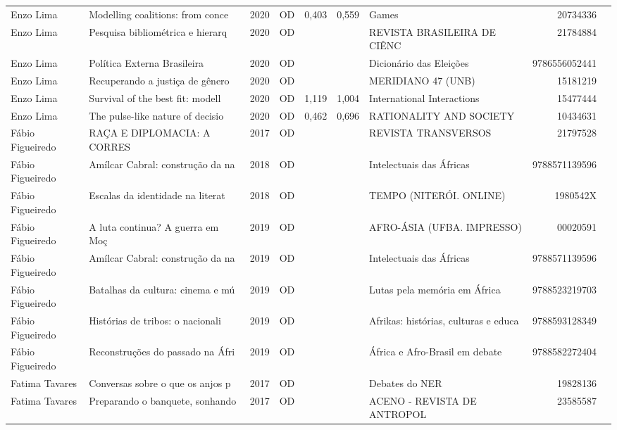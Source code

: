 \documentclass[12pt,brazil]{article}\usepackage[]{graphicx}\usepackage[]{xcolor}
\begin{document}
\begin{longtable}{lllrrllrr}
Enzo Lima & Modelling coalitions: from conce & 2020 & OD & 0,403 & 0,559 & Games & 20734336 \\
Enzo Lima & Pesquisa bibliométrica e hierarq & 2020 & OD &  &  & REVISTA BRASILEIRA DE CIÊNC & 21784884 \\
Enzo Lima & Política Externa Brasileira & 2020 & OD &  &  & Dicionário das Eleições & 9786556052441 \\
Enzo Lima & Recuperando a justiça de gênero  & 2020 & OD &  &  & MERIDIANO 47 (UNB) & 15181219 \\
Enzo Lima & Survival of the best fit: modell & 2020 & OD & 1,119 & 1,004 & International Interactions & 15477444 \\
Enzo Lima & The pulse-like nature of decisio & 2020 & OD & 0,462 & 0,696 & RATIONALITY AND SOCIETY & 10434631 \\
Fábio Figueiredo & RAÇA E DIPLOMACIA: A CORRES & 2017 & OD &  &  & REVISTA TRANSVERSOS & 21797528 \\
Fábio Figueiredo & Amílcar Cabral: construção da na & 2018 & OD &  &  & Intelectuais das Áfricas & 9788571139596 \\
Fábio Figueiredo & Escalas da identidade na literat & 2018 & OD &  &  & TEMPO (NITERÓI. ONLINE) & 1980542X \\
Fábio Figueiredo & A luta continua? A guerra em Moç & 2019 & OD &  &  & AFRO-ÁSIA (UFBA. IMPRESSO) & 00020591 \\
\rowcolor{duplic}\rowcolor{duplic}\rowcolor{duplic}\rowcolor{duplic}\rowcolor{duplic}\rowcolor{duplic}\rowcolor{duplic}\rowcolor{duplic}\rowcolor{duplic}\rowcolor{duplic}\rowcolor{duplic}\rowcolor{duplic}\rowcolor{duplic}\rowcolor{duplic}\rowcolor{duplic}\rowcolor{duplic}Fábio Figueiredo & Amílcar Cabral: construção da na & 2019 & OD &  &  & Intelectuais das Áfricas & 9788571139596 \\
Fábio Figueiredo & Batalhas da cultura: cinema e mú & 2019 & OD &  &  & Lutas pela memória em África & 9788523219703 \\
Fábio Figueiredo & Histórias de tribos: o nacionali & 2019 & OD &  &  & Afrikas: histórias, culturas e educa & 9788593128349 \\
Fábio Figueiredo & Reconstruções do passado na Áfri & 2019 & OD &  &  & África e Afro-Brasil em debate & 9788582272404 \\
Fatima Tavares & Conversas sobre o que os anjos p & 2017 & OD &  &  & Debates do NER & 19828136 \\
Fatima Tavares & Preparando o banquete, sonhando  & 2017 & OD &  &  & ACENO - REVISTA DE ANTROPOL & 23585587 \\

\end{longtable}
\end{document}
